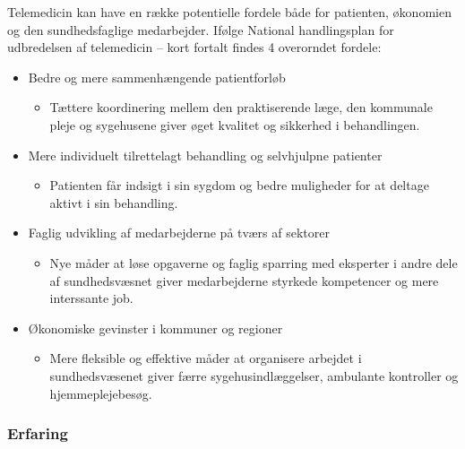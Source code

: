 Telemedicin kan have en række potentielle fordele både for patienten, økonomien og den sundhedsfaglige medarbejder. Ifølge \textquotedbl National handlingsplan for udbredelsen af telemedicin – kort fortalt\textquotedbl \cite{Regeringen2012} findes 4 overorndet fordele:

\begin{itemize} 
	\item Bedre og mere sammenhængende patientforløb
		\begin{itemize} 

			\item Tættere koordinering mellem den praktiserende læge, den kommunale pleje og sygehusene giver øget kvalitet og sikkerhed i behandlingen.

		\end{itemize} 

	\item Mere individuelt tilrettelagt behandling og selvhjulpne patienter
		\begin{itemize} 

			\item Patienten får indsigt i sin sygdom og bedre muligheder for at deltage aktivt i sin behandling.

		\end{itemize} 

	\item Faglig udvikling af medarbejderne på tværs af sektorer
		\begin{itemize} 

			\item Nye måder at løse opgaverne og faglig sparring med eksperter i andre dele af sundhedsvæsnet giver medarbejderne styrkede kompetencer og mere interssante job.

		\end{itemize} 

	\item Økonomiske gevinster i kommuner og regioner
		\begin{itemize} 

			\item Mere fleksible og effektive måder at organisere arbejdet i sundhedsvæsenet giver færre sygehusindlæggelser, ambulante kontroller og hjemmeplejebesøg.

		\end{itemize} 	
\end{itemize} 




\subsubsection{Erfaring}


